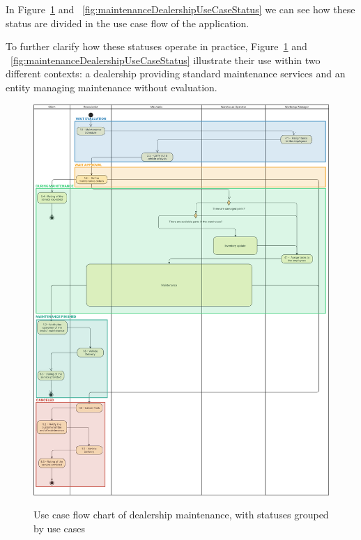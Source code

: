 In Figure~\ref{fig:maintenanceUseCaseStatus} and ~\ref{fig:maintenanceDealershipUseCaseStatus} we can see how these status are divided in the use case flow of the application.

To further clarify how these statuses operate in practice, Figure~\ref{fig:maintenanceUseCaseStatus} and ~\ref{fig:maintenanceDealershipUseCaseStatus} illustrate their use within two different contexts: a dealership providing standard maintenance services and an entity managing maintenance without evaluation.


\begin{figure}[h]
  \caption{Use case flow chart of dealership maintenance, with statuses grouped by use cases}
  \centering
  \includegraphics[width=\textwidth]{figs/Status/Maintenance/UseCaseStatus}
  \label{fig:maintenanceUseCaseStatus}
\end{figure}


